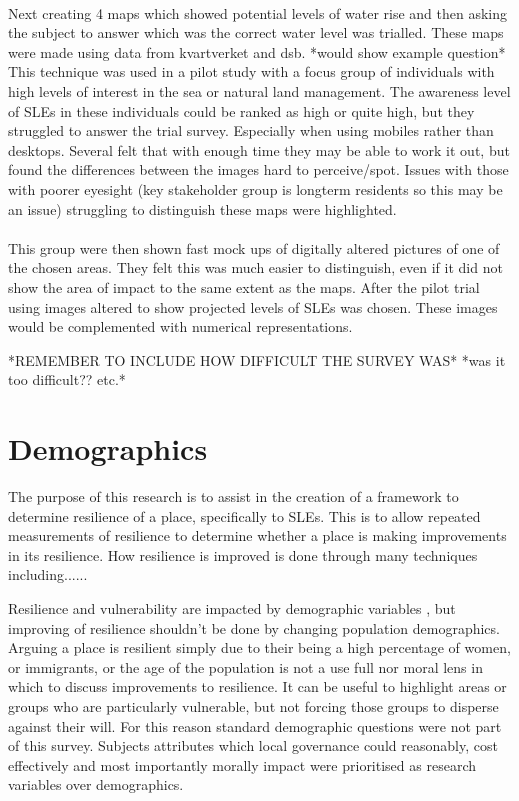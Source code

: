 \paragraph{}

Next creating 4 maps which showed potential levels of water rise and then asking the subject to answer which was the correct water level was trialled. These maps were made using data from kvartverket and dsb. *would show example question*
This technique was used in a pilot study with a focus group of individuals with high levels of interest in the sea or natural land management. The awareness level of SLEs in these individuals could be ranked as high or quite high, but they struggled to answer the trial survey. Especially when using mobiles rather than desktops. Several felt that with enough time they may be able to work it out, but found the differences between the images hard to perceive/spot. Issues with those with poorer eyesight (key stakeholder group is longterm residents so this may be an issue) struggling to distinguish these maps were highlighted.
\paragraph{}

This group were then shown fast mock ups of digitally altered pictures of one of the chosen areas. They felt this was much easier to distinguish, even if it did not show the area of impact to the same extent as the maps. 
After the pilot trial using images altered to show projected levels of SLEs was chosen. These images would be complemented with numerical representations. 

*REMEMBER TO INCLUDE HOW DIFFICULT THE SURVEY WAS*
*was it too difficult?? etc.*

\section{Demographics}
The purpose of this research is to assist in the creation of a framework to determine resilience of a place, specifically to SLEs. This is to allow repeated measurements of resilience to determine whether a place is making improvements in its resilience. How resilience is improved is done through many techniques including......

Resilience and vulnerability are impacted by demographic variables \cite{rod_integrated_2012}, but improving of resilience shouldn't be done by changing population demographics. Arguing a place is resilient simply due to their being a high percentage of women, or immigrants, or the age of the population is not a use full nor moral lens in which to discuss improvements to resilience. It can be useful to highlight areas or groups who are particularly vulnerable, but not forcing those groups to disperse against their will. For this reason standard demographic questions were not part of this survey. Subjects attributes which local governance could reasonably, cost effectively and most importantly morally impact were prioritised as research variables over demographics. 

